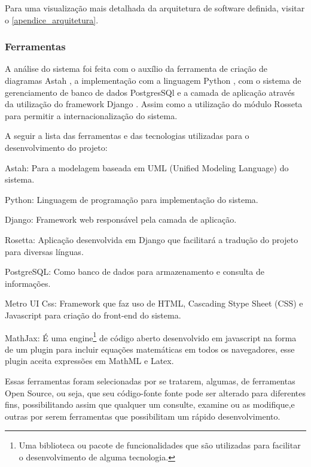 Para uma visualização mais detalhada da arquitetura de software definida, visitar o  \autoref{apendice_arquitetura}.

\subsubsection{Ferramentas}

 A análise do sistema foi feita com o auxílio da ferramenta de criação de diagramas Astah \cite{astah2016}, a implementação com a linguagem Python \cite{vanrossum2010python}, com o sistema de gerenciamento de banco de dados PostgresSQl \cite{momjian2001postgresql} e a camada de aplicação através da utilização do framework Django \cite{django2016}. Assim como a utilização do módulo Rosseta \cite{rosetta2016} para permitir a internacionalização do sistema.
 
A seguir a lista das ferramentas e das tecnologias utilizadas para o desenvolvimento do projeto:

\begin{alineas}
	\item Astah: Para a modelagem baseada em UML (Unified Modeling Language) do sistema.
	\item Python: Linguagem de programação para implementação do sistema.
    \item Django: Framework web responsável pela camada de aplicação.
    \item Rosetta: Aplicação desenvolvida em Django que facilitará a tradução do projeto para diversas línguas.  
    \item PostgreSQL: Como banco de dados para armazenamento e consulta de informações.
    \item Metro UI Css: Framework que faz uso de HTML, Cascading Stype Sheet (CSS) e Javascript para criação do front-end do sistema.
    \item MathJax: É uma engine\footnote{Uma biblioteca ou pacote de funcionalidades que são utilizadas para facilitar o desenvolvimento de alguma tecnologia.} de código aberto desenvolvido em javascript na forma de um plugin para incluir equações matemáticas em todos os navegadores, esse plugin aceita expressões em  MathML e Latex.

\end{alineas}

Essas ferramentas foram selecionadas por se tratarem, algumas, de ferramentas Open Source, ou seja, que seu código-fonte fonte pode ser alterado para diferentes fins, possibilitando assim que qualquer um consulte, examine ou as modifique,e outras por serem ferramentas que possibilitam um rápido desenvolvimento.

